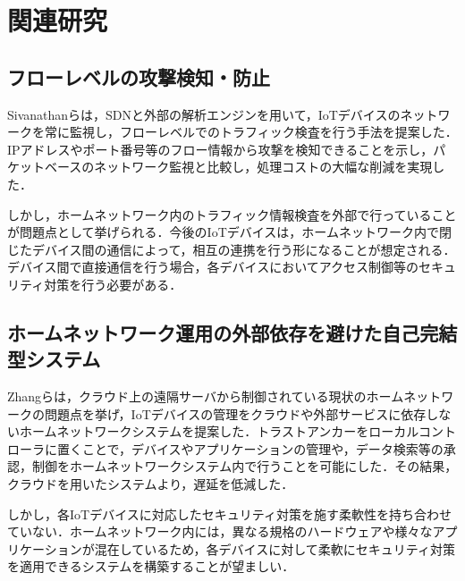 \documentclass[Japanese]{dicomopapers}
\begin{document}


\section{関連研究}
\subsection{フローレベルの攻撃検知・防止}
Sivanathanらは，SDNと外部の解析エンジンを用いて，IoTデバイスのネットワークを常に監視し，フローレベルでのトラフィック検査を行う手法を提案した\cite{lowcost}．IPアドレスやポート番号等のフロー情報から攻撃を検知できることを示し，パケットベースのネットワーク監視と比較し，処理コストの大幅な削減を実現した．\par
しかし，ホームネットワーク内のトラフィック情報検査を外部で行っていることが問題点として挙げられる．今後のIoTデバイスは，ホームネットワーク内で閉じたデバイス間の通信によって，相互の連携を行う形になることが想定される\cite{d2d}．デバイス間で直接通信を行う場合，各デバイスにおいてアクセス制御等のセキュリティ対策を行う必要がある．


\subsection{ホームネットワーク運用の外部依存を避けた自己完結型システム}
Zhangらは，クラウド上の遠隔サーバから制御されている現状のホームネットワークの問題点を挙げ，IoTデバイスの管理をクラウドや外部サービスに依存しないホームネットワークシステムを提案した\cite{sover}．トラストアンカーをローカルコントローラに置くことで，デバイスやアプリケーションの管理や，データ検索等の承認，制御をホームネットワークシステム内で行うことを可能にした．その結果，クラウドを用いたシステムより，遅延を低減した．\par
しかし，各IoTデバイスに対応したセキュリティ対策を施す柔軟性を持ち合わせていない．ホームネットワーク内には，異なる規格のハードウェアや様々なアプリケーションが混在しているため，各デバイスに対して柔軟にセキュリティ対策を適用できるシステムを構築することが望ましい．
\end{document}
